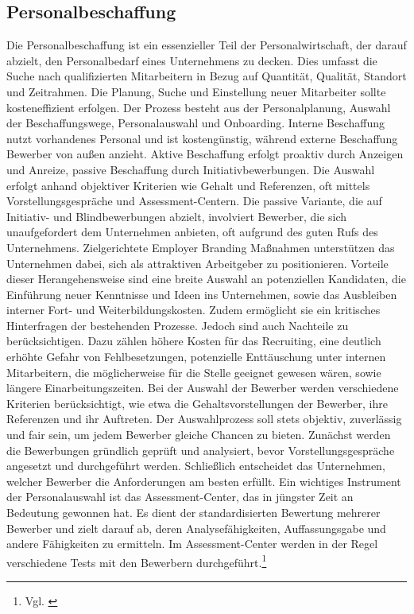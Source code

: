\subsection{Personalbeschaffung}
\label{sec:pseronalbeschaffung} %
Die Personalbeschaffung ist ein essenzieller Teil der Personalwirtschaft, der darauf abzielt, den Personalbedarf eines Unternehmens zu decken. Dies umfasst die Suche nach qualifizierten Mitarbeitern in Bezug auf Quantität, Qualität, Standort und Zeitrahmen. Die Planung, Suche und Einstellung neuer Mitarbeiter sollte kosteneffizient erfolgen. Der Prozess besteht aus der Personalplanung, Auswahl der Beschaffungswege, Personalauswahl und Onboarding. Interne Beschaffung nutzt vorhandenes Personal und ist kostengünstig, während externe Beschaffung Bewerber von außen anzieht. Aktive Beschaffung erfolgt proaktiv durch Anzeigen und Anreize, passive Beschaffung durch Initiativbewerbungen. Die Auswahl erfolgt anhand objektiver Kriterien wie Gehalt und Referenzen, oft mittels Vorstellungsgespräche und Assessment-Centern. Die passive Variante, die auf Initiativ- und Blindbewerbungen abzielt, involviert Bewerber, die sich unaufgefordert dem Unternehmen anbieten, oft aufgrund des guten Rufs des Unternehmens. Zielgerichtete Employer Branding Maßnahmen unterstützen das Unternehmen dabei, sich als attraktiven Arbeitgeber zu positionieren. Vorteile dieser Herangehensweise sind eine breite Auswahl an potenziellen Kandidaten, die Einführung neuer Kenntnisse und Ideen ins Unternehmen, sowie das Ausbleiben interner Fort- und Weiterbildungskosten. Zudem ermöglicht sie ein kritisches Hinterfragen der bestehenden Prozesse. Jedoch sind auch Nachteile zu berücksichtigen. Dazu zählen höhere Kosten für das Recruiting, eine deutlich erhöhte Gefahr von Fehlbesetzungen, potenzielle Enttäuschung unter internen Mitarbeitern, die möglicherweise für die Stelle geeignet gewesen wären, sowie längere Einarbeitungszeiten. Bei der Auswahl der Bewerber werden verschiedene Kriterien berücksichtigt, wie etwa die Gehaltsvorstellungen der Bewerber, ihre Referenzen und ihr Auftreten. Der Auswahlprozess soll stets objektiv, zuverlässig und fair sein, um jedem Bewerber gleiche Chancen zu bieten. Zunächst werden die Bewerbungen gründlich geprüft und analysiert, bevor Vorstellungsgespräche angesetzt und durchgeführt werden. Schließlich entscheidet das Unternehmen, welcher Bewerber die Anforderungen am besten erfüllt. Ein wichtiges Instrument der Personalauswahl ist das Assessment-Center, das in jüngster Zeit an Bedeutung gewonnen hat. Es dient der standardisierten Bewertung mehrerer Bewerber und zielt darauf ab, deren Analysefähigkeiten, Auffassungsgabe und andere Fähigkeiten zu ermitteln. Im Assessment-Center werden in der Regel verschiedene Tests mit den Bewerbern durchgeführt.\footnote{Vgl. \cite{Studyflix2024}} 


